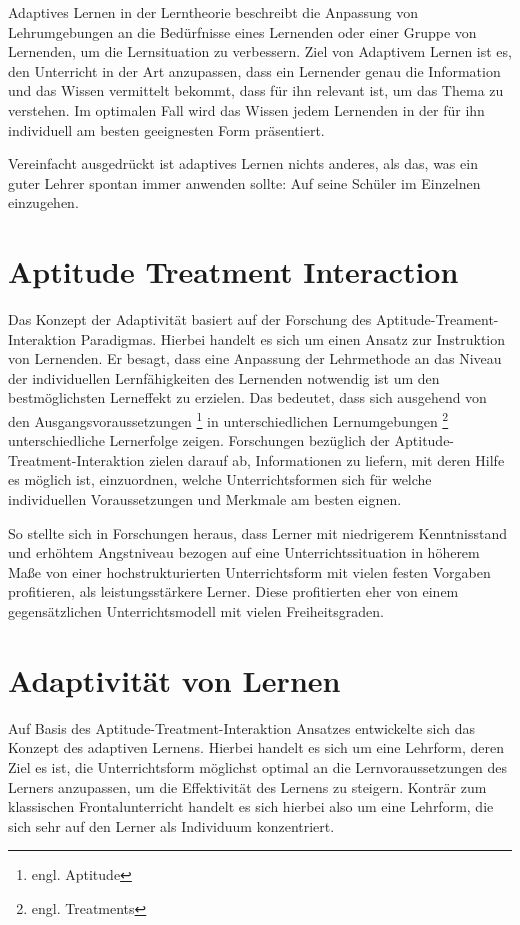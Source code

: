Adaptives Lernen in der Lerntheorie beschreibt die Anpassung von Lehrumgebungen
an die Bedürfnisse eines Lernenden oder einer Gruppe von Lernenden, um die Lernsituation
zu verbessern. Ziel von Adaptivem Lernen ist es, den Unterricht in der Art anzupassen,
dass ein Lernender genau die Information und das Wissen vermittelt bekommt, dass für ihn relevant ist,
um das Thema zu verstehen. Im optimalen Fall wird das Wissen jedem Lernenden
in der für ihn individuell am besten geeignesten Form präsentiert.

Vereinfacht ausgedrückt ist adaptives Lernen nichts anderes, als das, was ein guter Lehrer
spontan immer anwenden sollte: Auf seine Schüler im Einzelnen einzugehen.

\section{Aptitude Treatment Interaction}
Das Konzept der Adaptivität basiert auf der Forschung des Aptitude-Treament-Interaktion Paradigmas.
Hierbei handelt es sich um einen Ansatz zur Instruktion von Lernenden.
Er besagt, dass eine Anpassung der Lehrmethode an das Niveau der individuellen Lernfähigkeiten
des Lernenden notwendig ist um den bestmöglichsten Lerneffekt zu erzielen.
Das bedeutet, dass sich ausgehend von den Ausgangsvoraussetzungen \footnote{engl. Aptitude}
in unterschiedlichen Lernumgebungen \footnote{engl. Treatments} unterschiedliche Lernerfolge zeigen.
Forschungen bezüglich der Aptitude-Treatment-Interaktion zielen darauf ab, Informationen
zu liefern, mit deren Hilfe es möglich ist, einzuordnen, welche Unterrichtsformen sich
für welche individuellen Voraussetzungen und Merkmale am besten eignen.\cite[S. 203]{krohne2007psychologische}

So stellte sich in Forschungen heraus, dass Lerner mit niedrigerem Kenntnisstand und erhöhtem Angstniveau bezogen auf
eine Unterrichtssituation in höherem Maße von einer hochstrukturierten Unterrichtsform mit vielen festen Vorgaben profitieren,
als leistungsstärkere Lerner. Diese profitierten eher von einem gegensätzlichen Unterrichtsmodell mit vielen Freiheitsgraden.
\cite[S.65]{hasselhornlernverlaufsdiagnostik}

\section{Adaptivität von Lernen}
Auf Basis des Aptitude-Treatment-Interaktion Ansatzes entwickelte sich das Konzept des adaptiven Lernens.
Hierbei handelt es sich um eine Lehrform, deren Ziel es ist, die Unterrichtsform möglichst optimal an die Lernvoraussetzungen
des Lerners anzupassen, um die Effektivität des Lernens zu steigern. Konträr zum klassischen Frontalunterricht handelt
es sich hierbei also um eine Lehrform, die sich sehr auf den Lerner als Individuum konzentriert.

